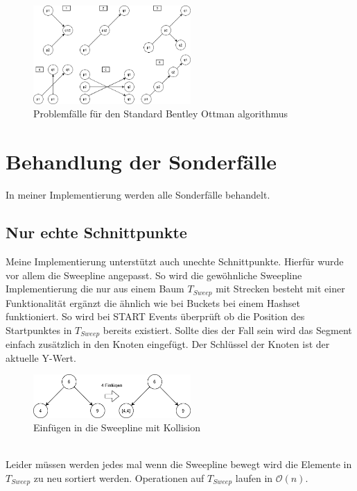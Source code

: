 \documentclass[conference]{IEEEtran}
\begin{document}
	\begin{figure}[h]
		\begin{center}
			\includegraphics[width=6cm]{ProblemFaelle.png}
			\caption{Problemfälle für den Standard Bentley Ottman algorithmus}
			\label{figure_3}
		\end{center}
	\end{figure}



	\section{Behandlung der Sonderfälle}
	In meiner Implementierung werden alle Sonderfälle behandelt.
	\subsection{Nur echte Schnittpunkte}
	Meine Implementierung unterstützt auch unechte Schnittpunkte. Hierfür wurde vor allem die Sweepline angepasst. So wird die gewöhnliche Sweepline Implementierung die nur aus einem Baum $T_{Sweep}$ mit Strecken besteht mit einer Funktionalität ergänzt die ähnlich wie bei Buckets bei einem Hashset funktioniert. So wird bei START Events überprüft ob die Position des Startpunktes in $T_{Sweep}$ bereits existiert. Sollte dies der Fall sein wird das Segment einfach zusätzlich in den Knoten eingefügt. Der Schlüssel der Knoten ist der aktuelle Y-Wert.\\
	\begin{figure}[h!]
		\begin{center}
			\includegraphics[width=6cm]{BaumKollision.png}
			\caption{Einfügen in die Sweepline mit Kollision}
			\label{figure_collision}
		\end{center}
	\end{figure}\\
	Leider müssen werden jedes mal wenn die Sweepline bewegt wird die Elemente in $T_{Sweep}$ zu neu sortiert werden. Operationen auf $T_{Sweep}$ laufen in $\mathcal{O}(n)$. 
	
\end{document}
